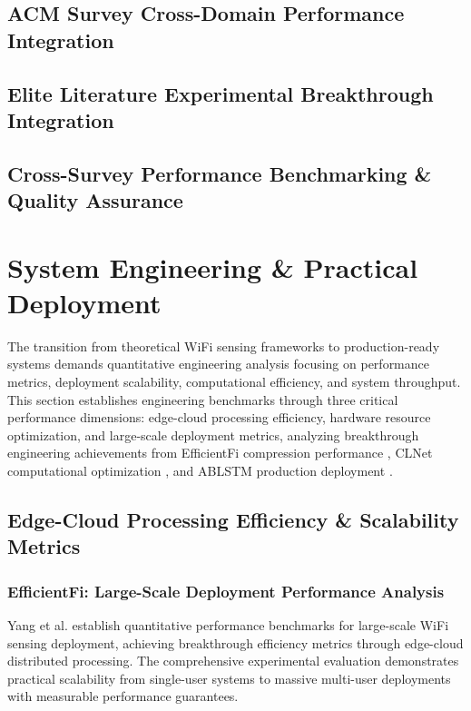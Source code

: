 \documentclass[journal]{IEEEtran}
\begin{document}
{\subsection{ACM Survey Cross-Domain Performance Integration}

\subsection{Elite Literature Experimental Breakthrough Integration}

\subsection{Cross-Survey Performance Benchmarking \& Quality Assurance}

\section{System Engineering \& Practical Deployment}
\label{sec:system_engineering}

The transition from theoretical WiFi sensing frameworks to production-ready systems demands quantitative engineering analysis focusing on performance metrics, deployment scalability, computational efficiency, and system throughput. This section establishes engineering benchmarks through three critical performance dimensions: edge-cloud processing efficiency, hardware resource optimization, and large-scale deployment metrics, analyzing breakthrough engineering achievements from EfficientFi compression performance \cite{yang2022efficientfi}, CLNet computational optimization \cite{ji2021clnet}, and ABLSTM production deployment \cite{chen2018wifi}.

\subsection{Edge-Cloud Processing Efficiency \& Scalability Metrics}

\subsubsection{EfficientFi: Large-Scale Deployment Performance Analysis}

Yang et al. \cite{yang2022efficientfi} establish quantitative performance benchmarks for large-scale WiFi sensing deployment, achieving breakthrough efficiency metrics through edge-cloud distributed processing. The comprehensive experimental evaluation demonstrates practical scalability from single-user systems to massive multi-user deployments with measurable performance guarantees.

}
\end{document}
